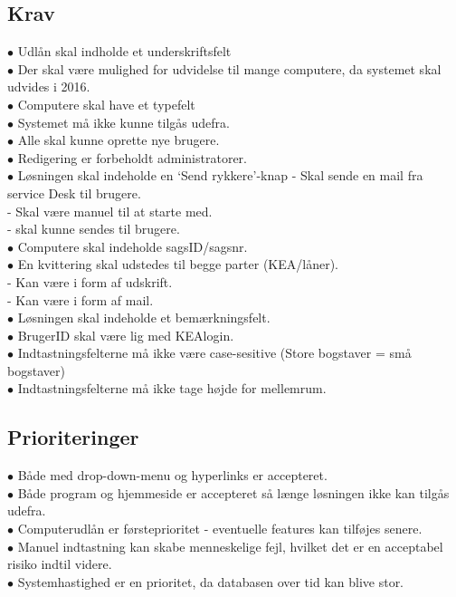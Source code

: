 \documentclass[a4paper]{article}
\begin{document}
\subsection*{Krav}
$\bullet$ Udlån skal indholde et underskriftsfelt \\
$\bullet$ Der skal være mulighed for udvidelse til mange computere, da systemet skal udvides i 2016. \\
$\bullet$ Computere skal have et typefelt\\
$\bullet$ Systemet må ikke kunne tilgås udefra. \\
$\bullet$ Alle skal kunne oprette nye brugere. \\
$\bullet$ Redigering er forbeholdt administratorer. \\
$\bullet$ Løsningen skal indeholde en ‘Send rykkere’-knap - Skal sende en mail fra service Desk til brugere. \\
\indent - Skal være manuel til at starte med. \\
\indent - skal kunne sendes til brugere. \\
$\bullet$ Computere skal indeholde sagsID/sagsnr. \\
$\bullet$ En kvittering skal udstedes til begge parter (KEA/låner).\\
\indent - Kan være i form af udskrift. \\
\indent - Kan være i form af mail. \\
$\bullet$ Løsningen skal indeholde et bemærkningsfelt. \\
$\bullet$ BrugerID skal være lig med KEAlogin. \\
$\bullet$ Indtastningsfelterne må ikke være case-sesitive (Store bogstaver = små bogstaver)\\
$\bullet$ Indtastningsfelterne må ikke tage højde for mellemrum.
\subsection*{Prioriteringer}
$\bullet$ Både med drop-down-menu og hyperlinks er accepteret. \\
$\bullet$ Både program og hjemmeside er accepteret så længe løsningen ikke kan tilgås udefra. \\
$\bullet$ Computerudlån er førsteprioritet - eventuelle features kan tilføjes senere. \\
$\bullet$ Manuel indtastning kan skabe menneskelige fejl, hvilket det er en acceptabel risiko indtil videre. \\
$\bullet$ Systemhastighed er en prioritet, da databasen over tid kan blive stor.
\end{document}

